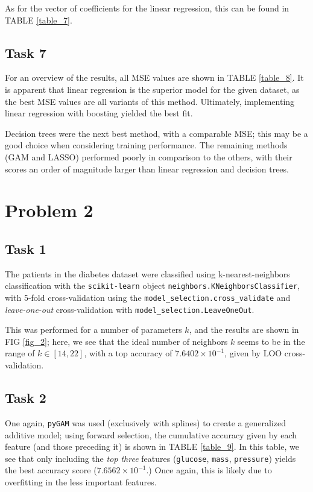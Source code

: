 \documentclass[twoside,twocolumn,10pt]{revtex4-1}
\begin{document}
	As for the vector of coefficients for the linear regression, this can be found in TABLE \ref{table_7}.
	 
	\subsection*{Task 7}
	
	For an overview of the results, all MSE values are shown in TABLE \ref{table_8}.  It is apparent that linear regression is the superior model for the given dataset, as the best MSE values are all variants of this method.  Ultimately, implementing linear regression with boosting yielded the best fit.  
	
	Decision trees were the next best method, with a comparable MSE; this may be a good choice when considering training performance.  The remaining methods (GAM and LASSO) performed poorly in comparison to the others, with their scores an order of magnitude larger than linear regression and decision trees.

	\section{Problem 2}
	
	\subsection*{Task 1}
	
	The patients in the diabetes dataset were classified using k-nearest-neighbors classification with the \texttt{scikit-learn} object \texttt{neighbors.KNeighborsClassifier}, with 5-fold cross-validation using the \texttt{model\_selection.cross\_validate} and \textit{leave-one-out} cross-validation with \texttt{model\_selection.LeaveOneOut}.  
	
	This was performed for a number of parameters $k$, and the results are shown in FIG \ref{fig_2}; here, we see that the ideal number of neighbors $k$ seems to be in the range of $k \in [14,22]$, with a top accuracy of $7.6402 \times 10^{-1}$, given by LOO cross-validation.
	
	\subsection*{Task 2}
	
	One again, \texttt{pyGAM} was used (exclusively with splines) to create a generalized additive model; using forward selection, the cumulative accuracy given by each feature (and those preceding it) is shown in TABLE \ref{table_9}.  In this table, we see that only including the \textit{top three} features (\texttt{glucose}, \texttt{mass}, \texttt{pressure}) yields the best accuracy score ($7.6562 \times 10^{-1}$.) Once again, this is likely due to overfitting in the less important features.
	
\end{document}
